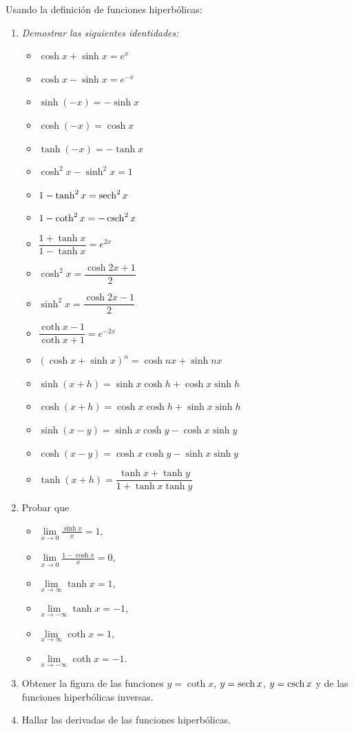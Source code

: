 \begin{ejer} Usando la definición de funciones hiperbólicas:
  \begin{enumerate}
    \item \textit{Demostrar las siguientes identidades:}
      \begin{itemize}
        \item $\cosh x+\sinh x=e^{x}$
        \item $\cosh x-\sinh x=e^{-x}$
        \item $\sinh (-x)=-\sinh x$
        \item $\cosh (-x)=\cosh x$
        \item $\tanh (-x)=-\tanh x$
        \item $\cosh ^{2}x-\sinh ^{2}x=1$
        \item $1-\tanh ^{2}x=\sech^{2}x$
        \item $1-\coth ^{2}x=-\csch^{2}x$
        \item $\dfrac{1+\tanh x}{1-\tanh x}=e^{2x}$
        \item $\cosh ^{2}x=\dfrac{\cosh 2x+1}{2}$
        \item $\sinh ^{2}x=\dfrac{\cosh 2x-1}{2}$
        \item $\dfrac{\coth x-1}{\coth x+1}=e^{-2x}$
        \item $(\cosh x+\sinh x)^{n}=\cosh nx+\sinh nx$
        \item $\sinh (x+h)=\sinh x\cosh h+\cosh x\sinh h$
        \item $\cosh (x+h)=\cosh x\cosh h+\sinh x\sinh h$
        \item $\sinh (x-y)= \sinh x\cosh y-\cosh x\sinh y$
        \item $\cosh (x-y)= \cosh x\cosh y-\sinh x\sinh y$
        \item $\tanh (x+h)=\dfrac{\tanh x+\tanh y}{1+\tanh x\tanh y}$
      \end{itemize}
    \item Probar que

      \begin{itemize}
        \item $\lim\limits_{x\rightarrow 0}\frac{\sinh x}{x}=1$,
        \item $\lim\limits_{x\rightarrow 0}\frac{1-\cosh x}{x}=0$,
        \item $\lim\limits_{x\rightarrow \infty }\tanh x= 1$,
        \item $\lim\limits_{x\rightarrow -\infty }\tanh x= -1$,
        \item $\lim\limits_{x\rightarrow \infty }\coth x= 1$,
        \item $\lim\limits_{x\rightarrow -\infty }\coth x= -1$.
      \end{itemize}

    \item Obtener la figura de las funciones $y=\coth x$, $y=\sech x$, $y=\csch x$ y de las funciones
      hiperbólicas inversas.

    \item Hallar las derivadas de las funciones hiperbólicas.
  \end{enumerate}
\end{ejer}

